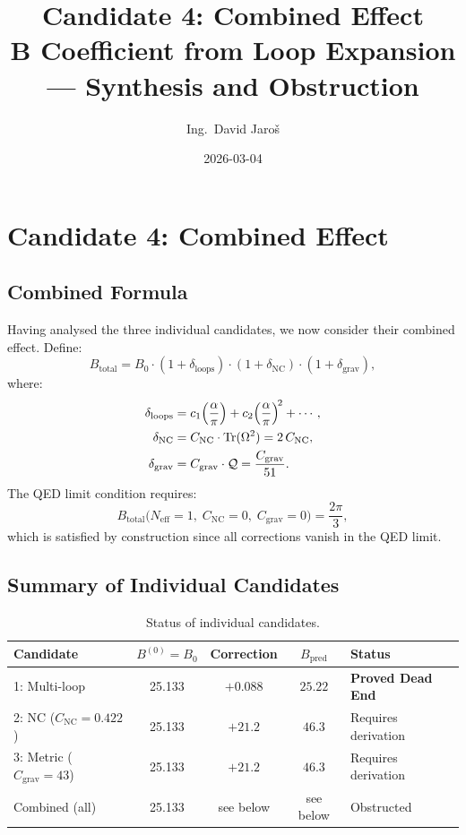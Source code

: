 \documentclass[11pt,a4paper]{article}
\title{Candidate 4: Combined Effect\\
    \large B Coefficient from Loop Expansion — Synthesis and Obstruction}
\author{Ing.\ David Jaroš}
\date{2026-03-04}
\theoremstyle{remark}
\begin{document}
  \maketitle
\fi

\section{Candidate 4: Combined Effect}
\label{sec:candidate4_combined}

\subsection{Combined Formula}

Having analysed the three individual candidates, we now consider their combined effect.
Define:
\begin{equation}
  B_{\mathrm{total}} = B_0 \cdot (1 + \delta_{\mathrm{loops}})
    \cdot (1 + \delta_{\mathrm{NC}})
    \cdot (1 + \delta_{\mathrm{grav}}),
  \label{eq:B_combined}
\end{equation}
where:
\begin{align}
  \delta_{\mathrm{loops}} &= c_1\Bigl(\frac{\alpha}{\pi}\Bigr)
    + c_2\Bigl(\frac{\alpha}{\pi}\Bigr)^{\!2} + \cdots, \label{eq:delta_loops}\\
  \delta_{\mathrm{NC}} &= C_{\mathrm{NC}} \cdot
    \mathrm{Tr}(\Omega^2) = 2\,C_{\mathrm{NC}}, \label{eq:delta_NC}\\
  \delta_{\mathrm{grav}} &= C_{\mathrm{grav}} \cdot \mathcal{Q}
    = \frac{C_{\mathrm{grav}}}{51}. \label{eq:delta_grav}
\end{align}
The QED limit condition requires:
\begin{equation}
  B_{\mathrm{total}}\bigl(N_{\mathrm{eff}} = 1,\; C_{\mathrm{NC}} = 0,\;
    C_{\mathrm{grav}} = 0\bigr) = \frac{2\pi}{3},
  \label{eq:qed_combined}
\end{equation}
which is satisfied by construction since all corrections vanish in the QED limit. \checkmark

\subsection{Summary of Individual Candidates}

\begin{table}[h]
  \centering
  \caption{Status of individual candidates.}
  \label{tab:candidates_summary}
  \begin{tabular}{lcccl}
    \toprule
    Candidate & $B^{(0)} = B_0$ & Correction & $B_{\mathrm{pred}}$ & Status \\
    \midrule
    1: Multi-loop   & 25.133 & $+0.088$ & $25.22$ & \textbf{Proved Dead End} \\
    2: NC ($C_{\mathrm{NC}}=0.422$) & 25.133 & $+21.2$ & $46.3$ & Requires derivation \\
    3: Metric ($C_{\mathrm{grav}}=43$) & 25.133 & $+21.2$ & $46.3$ & Requires derivation \\
    \midrule
    Combined (all) & 25.133 & see below & see below & Obstructed \\
    \bottomrule
  \end{tabular}
\end{table}
\end{document}
